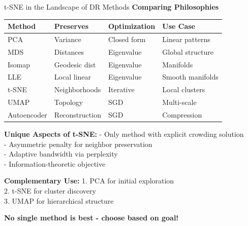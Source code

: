 \documentclass[10pt]{beamer}
\newcommand{\emphtext}[1]{\textcolor{upcblue}{\textbf{#1}}}
\newcommand{\warningbox}[1]{\colorbox{red!10}{\begin{minipage}{0.85\textwidth}\centering #1\end{minipage}}}
\begin{document}
\begin{frame}{t-SNE in the Landscape of DR Methods}
\emphtext{Comparing Philosophies}

\vspace{0.3cm}
\begin{center}
\small
\begin{tabular}{llll}
\toprule
\textbf{Method} & \textbf{Preserves} & \textbf{Optimization} & \textbf{Use Case} \\
\midrule
PCA & Variance & Closed form & Linear patterns \\
MDS & Distances & Eigenvalue & Global structure \\
Isomap & Geodesic dist & Eigenvalue & Manifolds \\
LLE & Local linear & Eigenvalue & Smooth manifolds \\
t-SNE & Neighborhoods & Iterative & Local clusters \\
UMAP & Topology & SGD & Multi-scale \\
Autoencoder & Reconstruction & SGD & Compression \\
\bottomrule
\end{tabular}
\end{center}

\vspace{0.3cm}
\textbf{Unique Aspects of t-SNE:}
\footnotesize
- Only method with explicit crowding solution\\
- Asymmetric penalty for neighbor preservation\\
- Adaptive bandwidth via perplexity\\
- Information-theoretic objective

\vspace{0.2cm}
\textbf{Complementary Use:}
\footnotesize
1. PCA for initial exploration\\
2. t-SNE for cluster discovery\\
3. UMAP for hierarchical structure

\begin{center}
\warningbox{\footnotesize\textbf{No single method is best - choose based on goal!}}
\end{center}
\end{frame}
\end{document}
